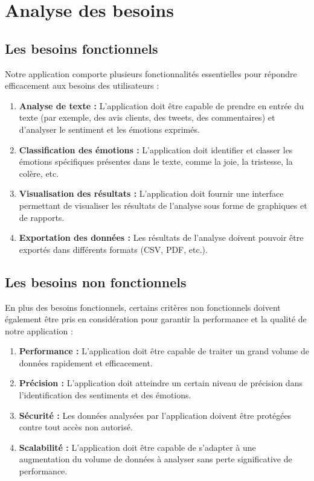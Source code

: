\section{Analyse des besoins}
\subsection{Les besoins fonctionnels}
Notre application comporte plusieurs fonctionnalités essentielles pour répondre efficacement aux besoins des utilisateurs :
\begin{enumerate}
    \item \textbf{Analyse de texte :} L'application doit être capable de prendre en entrée du texte (par exemple, des avis clients, des tweets, des commentaires) et d'analyser le sentiment et les émotions exprimés.
    \item \textbf{Classification des émotions :} L'application doit identifier et classer les émotions spécifiques présentes dans le texte, comme la joie, la tristesse, la colère, etc.
    \item \textbf{Visualisation des résultats :} L'application doit fournir une interface permettant de visualiser les résultats de l'analyse sous forme de graphiques et de rapports.
    \item \textbf{Exportation des données :} Les résultats de l'analyse doivent pouvoir être exportés dans différents formats (CSV, PDF, etc.).
\end{enumerate}
\subsection{Les besoins non fonctionnels}
En plus des besoins fonctionnels, certains critères non fonctionnels doivent également être pris en considération pour garantir la performance et la qualité de notre application :
\begin{enumerate}
    \item \textbf{Performance :} L'application doit être capable de traiter un grand volume de données rapidement et efficacement. 
    \item \textbf{Précision :} L'application doit atteindre un certain niveau de précision dans l'identification des sentiments et des émotions.
    \item \textbf{Sécurité :} Les données analysées par l'application doivent être protégées contre tout accès non autorisé.
    \item \textbf{Scalabilité :} L'application doit être capable de s'adapter à une augmentation du volume de données à analyser sans perte significative de performance.
\end{enumerate}



